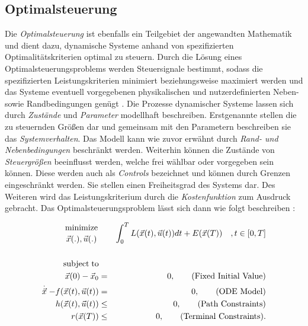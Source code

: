 \subsection{Optimalsteuerung}

Die \textit{Optimalsteuerung} ist ebenfalls ein Teilgebiet der angewandten Mathematik und dient dazu, dynamische Systeme anhand von spezifizierten Optimalitätskriterien optimal zu steuern. Durch die Lösung eines Optimalsteuerungsproblems werden Steuersignale bestimmt, sodass die spezifizierten Leistungskriterien minimiert beziehungsweise maximiert werden und das Systeme eventuell vorgegebenen physikalischen und nutzerdefinierten Neben- sowie Randbedingungen genügt \cite[S.~3f.]{ki04}.
Die Prozesse dynamischer Systeme lassen sich durch \textit{Zustände} und \textit{Parameter} modellhaft beschreiben. Erstgenannte stellen die zu steuernden Größen dar und gemeinsam mit den Parametern beschreiben sie das \textit{Systemverhalten}. Das Modell kann wie zuvor erwähnt durch \textit{Rand- und Nebenbedingungen} beschränkt werden. Weiterhin können die Zustände von \textit{Steuergrößen} beeinflusst werden, welche frei wählbar oder vorgegeben sein können. Diese werden auch als \textit{Controls} bezeichnet und können durch Grenzen eingeschränkt werden. Sie stellen einen Freiheitsgrad des Systems dar. Des Weiteren wird das Leistungskriterium durch die \textit{Kostenfunktion} zum Ausdruck gebracht. Das Optimalsteuerungsproblem lässt sich dann wie folgt beschreiben \cite[S.~61]{di14}:

\begin{eqnarray}
\label{eq:opt}
		{\text{minimize} \atop \vec{x}(.),\vec{u}(.)} & &\int_0^T L(\vec{x}(t),\vec{u}(t)) dt + E(\vec{x}(T)) \quad ,t \in [0,T] \\
\nonumber		&&\\
\nonumber		\text{subject}\; \text{to} & &\\
\nonumber		\vec{x}(0)-\vec{x}_{0} & = & 0,	\qquad \text{(Fixed Initial Value)}\\
\nonumber		\stackrel{.}{\vec{x}}-f(\vec{x}(t),\vec{u}(t)) & = & 0,\qquad \text{(ODE Model)}\\
\nonumber		h(\vec{x}(t),\vec{u}(t)) & \leq & 0, \qquad \text{(Path Constraints)}\\
\nonumber		r(\vec{x}(T)) & \leq & 0,\qquad \text{(Terminal Constraints).}
\end{eqnarray}

